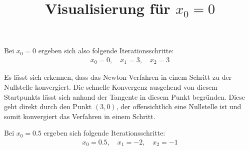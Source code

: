 \documentclass[11pt]{article}
\theoremstyle{plain}
\theoremstyle{definition}
\renewcommand{\a}{\"{a}}
\renewcommand{\u}{\"{u}}
\begin{document}
Bei $x_0=0$ ergeben sich also folgende Iterationsschritte:
\begin{align*}
x_0 = 0, \quad x_1 = 3, \quad x_2 = 3 
\end{align*}

\begin{figure}[!ht]
\centering
{}

\title{Visualisierung f\u r $x_0=0$}
\end{figure}

Es l\a sst sich erkennen, dass das Newton-Verfahren in einem Schritt zu der Nullstelle konvergiert. Die schnelle Konvergenz ausgehend von diesem Startpunkts l\a sst sich anhand der Tangente in diesem Punkt begr\u nden. Diese geht direkt durch den Punkt $(3,0)$, der offensichtlich eine Nullstelle ist und somit konvergiert das Verfahren in einem Schritt.\vspace{0.3cm}

Bei $x_0=0.5$ ergeben sich folgende Iterationsschritte:
\begin{align*}
x_0 = 0.5, \quad x_1 = -2, \quad x_2 = -1 
\end{align*}
\end{document}
